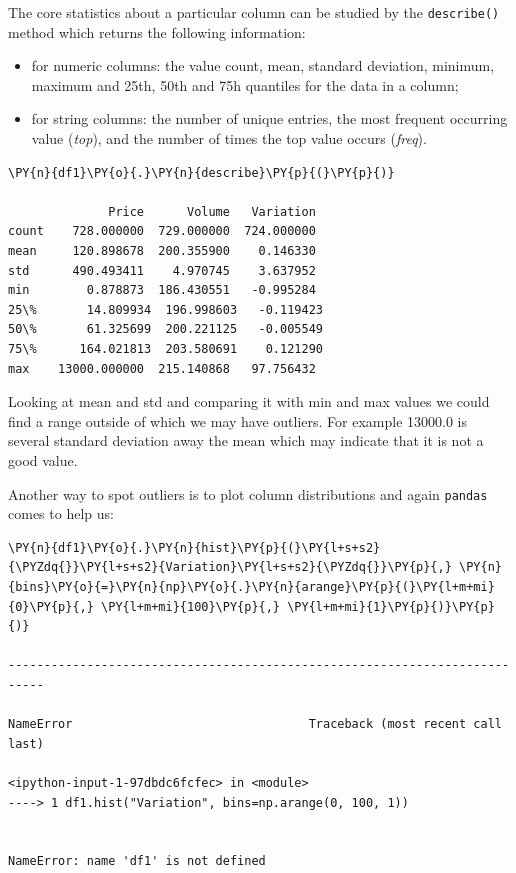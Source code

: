 The core statistics about a particular column can be studied by the \texttt{describe()} method which returns the following information:
\begin{itemize}
	\tightlist
\item for numeric columns: the value count, mean, standard deviation, minimum, maximum and 25th, 50th and 75h quantiles for the data in a column;
\item for string columns: the number of unique entries, the most frequent occurring value (\emph{top}), and the number of times the top value occurs (\emph{freq}).
\end{itemize}

\begin{tcolorbox}[breakable, size=fbox, boxrule=1pt, pad at break*=1mm,colback=cellbackground, colframe=cellborder]
\begin{Verbatim}[commandchars=\\\{\}]
\PY{n}{df1}\PY{o}{.}\PY{n}{describe}\PY{p}{(}\PY{p}{)}

              Price      Volume   Variation
count    728.000000  729.000000  724.000000
mean     120.898678  200.355900    0.146330
std      490.493411    4.970745    3.637952
min        0.878873  186.430551   -0.995284
25\%       14.809934  196.998603   -0.119423
50\%       61.325699  200.221125   -0.005549
75\%      164.021813  203.580691    0.121290
max    13000.000000  215.140868   97.756432
\end{Verbatim}
\end{tcolorbox}
        
Looking at mean and std and comparing it with min and max values we could find a range outside of which we may have outliers. For example 13000.0 is several standard deviation away the mean which may indicate that it is not a good value.

Another way to spot outliers is to plot column distributions and again \texttt{pandas} comes to help us:
\begin{tcolorbox}[breakable, size=fbox, boxrule=1pt, pad at break*=1mm,colback=cellbackground, colframe=cellborder]
\begin{Verbatim}[commandchars=\\\{\}]
\PY{n}{df1}\PY{o}{.}\PY{n}{hist}\PY{p}{(}\PY{l+s+s2}{\PYZdq{}}\PY{l+s+s2}{Variation}\PY{l+s+s2}{\PYZdq{}}\PY{p}{,} \PY{n}{bins}\PY{o}{=}\PY{n}{np}\PY{o}{.}\PY{n}{arange}\PY{p}{(}\PY{l+m+mi}{0}\PY{p}{,} \PY{l+m+mi}{100}\PY{p}{,} \PY{l+m+mi}{1}\PY{p}{)}\PY{p}{)}

---------------------------------------------------------------------------

NameError                                 Traceback (most recent call last)

<ipython-input-1-97dbdc6fcfec> in <module>
----> 1 df1.hist("Variation", bins=np.arange(0, 100, 1))
    

NameError: name 'df1' is not defined
\end{Verbatim}
\end{tcolorbox}


